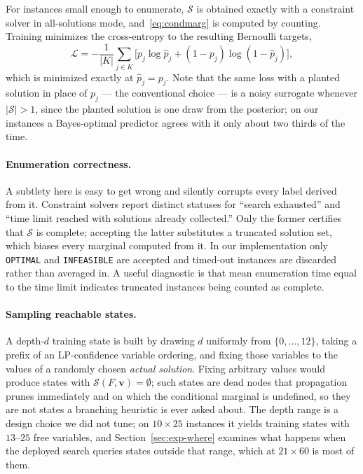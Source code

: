 \documentclass[preprint,12pt]{elsarticle}
\newcommand{\SOL}{\mathcal{S}}
\begin{document}
For instances small enough to enumerate, $\SOL$ is obtained exactly with a constraint solver in all-solutions mode, and~\eqref{eq:condmarg} is computed by counting. Training minimizes the cross-entropy to the resulting Bernoulli targets,
\begin{equation}
\mathcal{L} = -\frac{1}{|K|}\sum_{j\in K}\Big[p_j\log\hat{p}_j + (1-p_j)\log(1-\hat{p}_j)\Big],
\label{eq:loss}
\end{equation}
which is minimized exactly at $\hat{p}_j = p_j$. Note that the same loss with a planted solution in place of $p_j$ --- the conventional choice --- is a noisy surrogate whenever $|\SOL|>1$, since the planted solution is one draw from the posterior; on our instances a Bayes-optimal predictor agrees with it only about two thirds of the time.

\paragraph{Enumeration correctness.} A subtlety here is easy to get wrong and silently corrupts every label derived from it. Constraint solvers report distinct statuses for ``search exhausted'' and ``time limit reached with solutions already collected.'' Only the former certifies that $\SOL$ is complete; accepting the latter substitutes a truncated solution set, which biases every marginal computed from it. In our implementation only \texttt{OPTIMAL} and \texttt{INFEASIBLE} are accepted and timed-out instances are discarded rather than averaged in. A useful diagnostic is that mean enumeration time equal to the time limit indicates truncated instances being counted as complete.

\paragraph{Sampling reachable states.} A depth-$d$ training state is built by drawing $d$ uniformly from $\{0,\dots,12\}$, taking a prefix of an LP-confidence variable ordering, and fixing those variables to the values of a randomly chosen \emph{actual solution}. Fixing arbitrary values would produce states with $\SOL(F,\mathbf{v})=\emptyset$; such states are dead nodes that propagation prunes immediately and on which the conditional marginal is undefined, so they are not states a branching heuristic is ever asked about. The depth range is a design choice we did not tune; on $10\times25$ instances it yields training states with $13$--$25$ free variables, and Section~\ref{sec:exp-where} examines what happens when the deployed search queries states outside that range, which at $21\times60$ is most of them.
\end{document}
